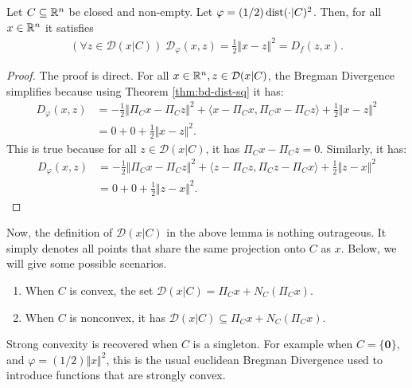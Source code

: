 \documentclass[12pt]{article}
\begin{document}
    \begin{lemma}\label{lemma:conds-dsbd-like-scnvx}
        Let $C \subseteq \mathbb R^n$ be closed and non-empty. 
        Let $\varphi = (1/2)\operatorname{dist}(\cdot | C)^2$.
        Then, for all $x \in \mathbb R^n$ it satisfies
        \begin{align*}
            (\forall z \in \mathcal D(x | C))\; \mathcal D_\varphi(x, z) = \frac{1}{2}\Vert x - z\Vert^2 = D_f(z, x). 
        \end{align*}
    \end{lemma}
    \begin{proof}
        The proof is direct. 
        For all $x \in \mathbb R^n, z \in \mathcal D(x | C)$, the Bregman Divergence simplifies because using Theorem \ref{thm:bd-dist-sq} it has: 
        \begin{align*}
            D_\varphi (x, z) &= 
            - \frac{1}{2}\Vert \Pi_C x - \Pi_C z\Vert^2 
            + \langle x - \Pi_C x, \Pi_C x - \Pi_C z\rangle 
            + \frac{1}{2}\Vert x - z\Vert^2
            \\
            &= 0 + 0 + \frac{1}{2}\Vert x - z\Vert^2. 
        \end{align*}
        This is true because for all $z \in \mathcal D(x | C)$, it has $\Pi_C x - \Pi_C z = 0$. 
        Similarly, it has: 
        \begin{align*}
            D_\varphi(x, z) &= 
            - \frac{1}{2}\Vert \Pi_C x - \Pi_C z\Vert^2 
            + \langle z - \Pi_C z, \Pi_C z - \Pi_C x\rangle
            + \frac{1}{2}\Vert z - x\Vert^2
            \\
            &= 0 + 0 + \frac{1}{2}\Vert z - x\Vert^2. 
        \end{align*}
    \end{proof}
    \par
    Now, the definition of $\mathcal D(x | C)$ in the above lemma is nothing outrageous. 
    It simply denotes all points that share the same projection onto $C$ as $x$. 
    Below, we will give some possible scenarios. 
    \begin{enumerate}
        \item When $C$ is convex, the set $\mathcal D(x | C) = \Pi_C x + N_C(\Pi_C x)$. 
        \item When $C$ is nonconvex, it has $\mathcal D(x | C) \subseteq \Pi_C x + N_C(\Pi_C x)$. 
    \end{enumerate}
    Strong convexity is recovered when $C$ is a singleton. 
    For example when $C = \{\mathbf 0\}$, and $\varphi = (1/2)\Vert x\Vert^2$, this is the usual euclidean Bregman Divergence used to introduce functions that are strongly convex. 
\end{document}
